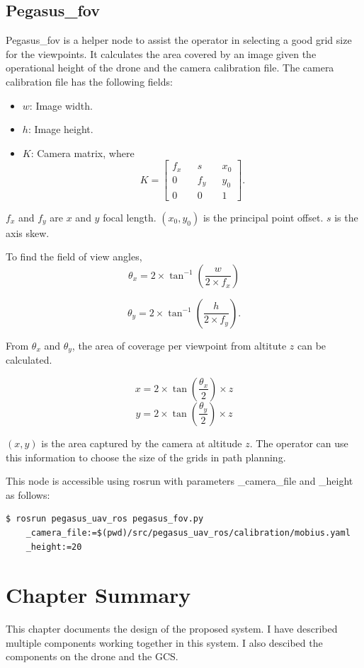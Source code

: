 \subsection{Pegasus\_fov}
Pegasus\_fov is a helper node to assist the operator in selecting a good grid size for the viewpoints. It calculates the area covered by an image given the operational height of the drone and the camera calibration file. The camera calibration file has the following fields:

\begin{itemize}
	\item $w$: Image width.
	\item $h$: Image height.
	\item $K$: Camera matrix, where 
	$$K = \begin{bmatrix}
	f_x && s   && x_0 \\
	0   && f_y && y_0 \\
	0   && 0   && 1
	\end{bmatrix}.$$
\end{itemize}

$f_x$ and $f_y$ are $x$ and $y$ focal length. $(x_0, y_0)$ is the principal point offset. $s$ is the axis skew.

To find the field of view angles,
$$ \theta_x = 2 \times \tan^{-1}(\frac{w}{2 \times f_x}) $$

$$ \theta_y = 2 \times \tan^{-1}(\frac{h}{2 \times f_y}).$$

From $\theta_x$ and $\theta_y$, the area of coverage per viewpoint from altitute $z$ can be calculated.

$$ x = 2 \times \tan(\frac{\theta_x}{2}) \times z $$
$$ y = 2 \times \tan(\frac{\theta_y}{2}) \times z $$ 

$(x, y)$ is the area captured by the camera at altitude $z$. The operator can use this information to choose the size of the grids in path planning.

This node is accessible using rosrun with parameters \_camera\_file and \_height as follows:

\begin{verbatim}
$ rosrun pegasus_uav_ros pegasus_fov.py 
    _camera_file:=$(pwd)/src/pegasus_uav_ros/calibration/mobius.yaml 
    _height:=20
\end{verbatim}

\section{Chapter Summary}
This chapter documents the design of the proposed system. I have described multiple components working together in this system. I also descibed the components on the drone and the GCS.

\FloatBarrier